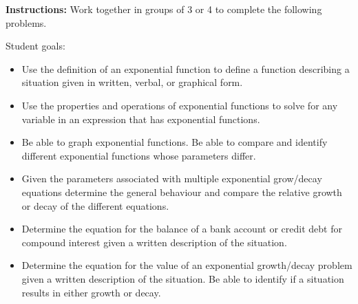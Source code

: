 


\noindent \textbf{Instructions:}  Work together in groups of  3 or 4 to complete the following problems.

Student goals:
\begin{itemize}
  \item Use the definition of an exponential function to define a
    function describing a situation given in written, verbal, or
    graphical form.
  \item Use the properties and operations of exponential functions to
    solve for any variable in an expression that has exponential functions.
  \item Be able to graph exponential functions. Be able to compare and
    identify different exponential functions whose parameters differ.
  \item Given the parameters associated with multiple exponential
    grow/decay equations determine the general behaviour and compare
    the relative growth or decay of the different equations.
  \item Determine the equation for the balance of a bank account or
    credit debt for compound interest given a written description of
    the situation.
  \item Determine the equation for the value of an exponential
    growth/decay problem given a written description of the
    situation. Be able to identify if a situation results in either
    growth or decay.
\end{itemize}



